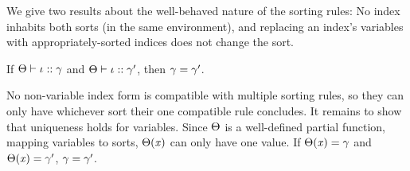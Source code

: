 We give two results about the well-behaved nature of the sorting rules:
No index inhabits both sorts (in the same environment),
and replacing an index's variables with appropriately-sorted indices
does not change the sort.


\begin{lemma}
  \label{UniqSort}
  If $\Theta \vdash \mathit{\iota} :: \mathit{\gamma}$
  and $\Theta \vdash \mathit{\iota} :: \mathit{\gamma}'$,
  then $\mathit{\gamma} = \mathit{\gamma}'$.
\end{lemma}
\begin{sproof}[\BODY]
  No non-variable index form is compatible with multiple sorting rules,
  so they can only have whichever sort their one compatible rule concludes.
  It remains to show that uniqueness holds for variables.
  Since $\Theta$ is a well-defined partial function,
  mapping variables to sorts,
  $\Theta(\mathit{x})$ can only have one value.
  If $\Theta(\mathit{x}) = \mathit{\gamma}$ and $\Theta(\mathit{x}) = \mathit{\gamma}'$, $\mathit{\gamma} = \mathit{\gamma}'$.
\end{sproof}

